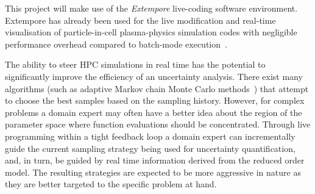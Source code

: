 This project will
make use of the \emph{Extempore} live-coding software
environment.%
 Extempore has already
been used for the live modification and real-time visualisation of
particle-in-cell plasma-physics simulation codes with
negligible performance overhead compared to batch-mode execution~\parencite{swiftLive2016}. 





The ability to steer HPC simulations in real time has
the potential to significantly improve the efficiency of an
uncertainty analysis. There exist many algorithms (such as 
adaptive Markov chain Monte Carlo methods~\parencite{GilksEtal1994}) 
that attempt to choose the best samples based on the sampling
history. However, for complex problems a domain expert
may often have
a better idea about the region of the parameter space where function
evaluations should be concentrated. Through live programming within a
tight feedback loop a domain expert can incrementally guide the
current sampling strategy being used for uncertainty 
quantification, and, in turn, be guided by 
real time information derived from the reduced order model. 
The resulting strategies are expected to be
more aggressive in nature as they are better targeted to the specific
problem at hand. 


